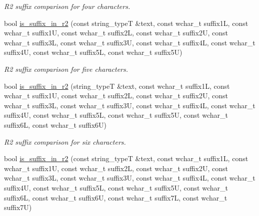 \begin{DoxyCompactItemize}
\begin{DoxyCompactList}\small\item\em R2 suffix comparison for four characters. \end{DoxyCompactList}\item 
\hypertarget{classstemming_1_1stem_aca8fba0d6b27d8da969508adc281cfa5}{bool \hyperlink{classstemming_1_1stem_aca8fba0d6b27d8da969508adc281cfa5}{is\+\_\+suffix\+\_\+in\+\_\+r2} (const string\+\_\+type\+T \&text, const wchar\+\_\+t suffix1\+L, const wchar\+\_\+t suffix1\+U, const wchar\+\_\+t suffix2\+L, const wchar\+\_\+t suffix2\+U, const wchar\+\_\+t suffix3\+L, const wchar\+\_\+t suffix3\+U, const wchar\+\_\+t suffix4\+L, const wchar\+\_\+t suffix4\+U, const wchar\+\_\+t suffix5\+L, const wchar\+\_\+t suffix5\+U)}\label{classstemming_1_1stem_aca8fba0d6b27d8da969508adc281cfa5}

\begin{DoxyCompactList}\small\item\em R2 suffix comparison for five characters. \end{DoxyCompactList}\item 
\hypertarget{classstemming_1_1stem_ad85a9757083c5fcbd6300367df2a648b}{bool \hyperlink{classstemming_1_1stem_ad85a9757083c5fcbd6300367df2a648b}{is\+\_\+suffix\+\_\+in\+\_\+r2} (string\+\_\+type\+T \&text, const wchar\+\_\+t suffix1\+L, const wchar\+\_\+t suffix1\+U, const wchar\+\_\+t suffix2\+L, const wchar\+\_\+t suffix2\+U, const wchar\+\_\+t suffix3\+L, const wchar\+\_\+t suffix3\+U, const wchar\+\_\+t suffix4\+L, const wchar\+\_\+t suffix4\+U, const wchar\+\_\+t suffix5\+L, const wchar\+\_\+t suffix5\+U, const wchar\+\_\+t suffix6\+L, const wchar\+\_\+t suffix6\+U)}\label{classstemming_1_1stem_ad85a9757083c5fcbd6300367df2a648b}

\begin{DoxyCompactList}\small\item\em R2 suffix comparison for six characters. \end{DoxyCompactList}\item 
\hypertarget{classstemming_1_1stem_a65e9882d17885e66208840b277fcee2e}{bool \hyperlink{classstemming_1_1stem_a65e9882d17885e66208840b277fcee2e}{is\+\_\+suffix\+\_\+in\+\_\+r2} (const string\+\_\+type\+T \&text, const wchar\+\_\+t suffix1\+L, const wchar\+\_\+t suffix1\+U, const wchar\+\_\+t suffix2\+L, const wchar\+\_\+t suffix2\+U, const wchar\+\_\+t suffix3\+L, const wchar\+\_\+t suffix3\+U, const wchar\+\_\+t suffix4\+L, const wchar\+\_\+t suffix4\+U, const wchar\+\_\+t suffix5\+L, const wchar\+\_\+t suffix5\+U, const wchar\+\_\+t suffix6\+L, const wchar\+\_\+t suffix6\+U, const wchar\+\_\+t suffix7\+L, const wchar\+\_\+t suffix7\+U)}\label{classstemming_1_1stem_a65e9882d17885e66208840b277fcee2e}


\end{DoxyCompactItemize}
